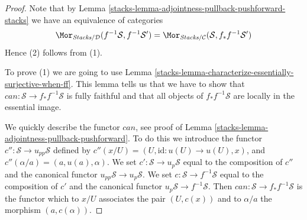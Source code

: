 \begin{proof}

Note that by
Lemma \ref{stacks-lemma-adjointness-pullback-pushforward-stacks}
we have an equivalence of categories
$$
\Mor_{\textit{Stacks}/\mathcal{D}}(f^{-1}\mathcal{S}, f^{-1}\mathcal{S}')
=
\Mor_{\textit{Stacks}/\mathcal{C}}(\mathcal{S}, f_*f^{-1}\mathcal{S}')
$$
Hence (2) follows from (1).

\medskip\noindent
To prove (1) we are going to use
Lemma \ref{stacks-lemma-characterize-essentially-surjective-when-ff}.
This lemma tells us that we have to show that
$can : \mathcal{S} \to f_*f^{-1}\mathcal{S}$ is
fully faithful and that all objects of $f_*f^{-1}\mathcal{S}$
are locally in the essential image.

\medskip\noindent
We quickly describe the functor $can$, see proof of
Lemma \ref{stacks-lemma-adjointness-pullback-pushforward}.
To do this we introduce the functor
$c'' : \mathcal{S} \to u_{pp}\mathcal{S}$ defined by
$c''(x/U) = (U, \text{id} : u(U) \to u(U), x)$, and
$c''(\alpha/a) = (a, u(a), \alpha)$. We set
$c' : \mathcal{S} \to u_p\mathcal{S}$ equal to the composition
of $c''$ and the canonical functor $u_{pp}\mathcal{S} \to u_p\mathcal{S}$.
We set $c : \mathcal{S} \to f^{-1}\mathcal{S}$ equal to the composition
of $c'$ and the canonical functor $u_p\mathcal{S} \to f^{-1}\mathcal{S}$.
Then $can : \mathcal{S} \to f_*f^{-1}\mathcal{S}$ is the functor
which to $x/U$ associates the pair $(U, c(x))$ and to
$\alpha/a$ the morphism $(a, c(\alpha))$.


\end{proof}
